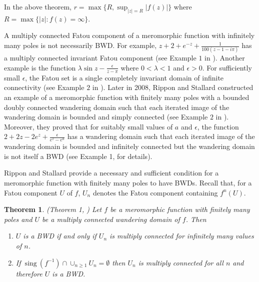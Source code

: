 \documentclass[11pt,a4paper]{article}
\newtheorem{theorem}{Theorem}[section]
\begin{document}
	In the above theorem,   $r=\max\{R, \sup_{|z|=R} |f(z)|\}$ where $R=\max\{|z|: f(z)=\infty\}$.


A multiply connected Fatou component of a  meromorphic function with infinitely many poles is not necessarily BWD. For example, $z+2+e^{-z}+\frac{1}{100(z-1-i\pi)}$ has a multiply connected invariant Fatou component (see Example $1$ in \cite{Dominguez 1998}). Another example is the function $\lambda\sin z-\frac{\epsilon}{z-\pi}$ where $0<\lambda<1$ and $\epsilon>0$. For sufficiently small $\epsilon$, the Fatou set is a single completely invariant domain of infinite connectivity (see Example $2$ in \cite{Dominguez 1998}). Later in 2008, Rippon and Stallard constructed an example of a meromorphic function with finitely many poles with a bounded doubly connected wandering domain such that each iterated image of the wandering domain is bounded and simply connected (see Example $2$ in \cite{RipponStallard 2008}). Moreover, they proved that for suitably small values of $a$ and $\epsilon$, the function $2+2z-2e^z+\frac{\epsilon}{e^z-e^a}$ has a wandering domain such that each iterated image of the wandering domain is bounded and infinitely connected but the wandering domain is not itself a BWD (see Example 1, \cite{RipponStallard 2008} for details).   
	
	\par  Rippon and Stallard provide a necessary and sufficient condition for a meromorphic function with finitely many poles to have BWDs.  Recall that, for a Fatou component $U$ of $f$, $U_n$ denotes the Fatou component containing $f^n (U)$.
	
	\begin{theorem}(Theorem 1, \cite{RipponStallard 2008})
		Let $f$ be a meromorphic function with finitely many poles and $U$ be a multiply connected wandering domain of $f$. Then
		\begin{enumerate}
			\item $U$ is a BWD if and only if $U_n$ is multiply connected for infinitely many values of $n$. 
			\item If $~\mbox{sing}~(f^{-1})\cap \cup_{n\geq 1} U_n= \emptyset$ then $U_n$ is multiply connected for all $n$ and therefore $U$ is a BWD.
		\end{enumerate}
\label{MC-IFF-BWD-FP}	\end{theorem} 
	
\end{document}
